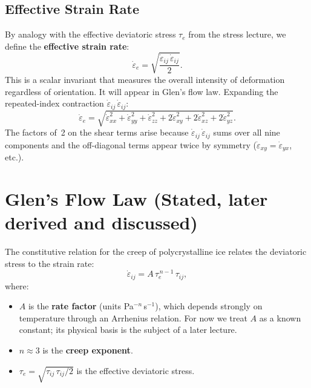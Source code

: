 \documentclass[11pt]{article}
\begin{document}
\subsection{Effective Strain Rate}

By analogy with the effective deviatoric stress $\tau_e$ from the stress lecture, we define the \textbf{effective strain rate}:
\begin{equation}
  \dot{\varepsilon}_e = \sqrt{\frac{\dot{\varepsilon}_{ij}\,\dot{\varepsilon}_{ij}}{2}}.
  \label{eq:eps_e}
\end{equation}
This is a scalar invariant that measures the overall intensity of deformation regardless of orientation.  It will appear in Glen's flow law.  Expanding the repeated-index contraction $\dot{\varepsilon}_{ij}\,\dot{\varepsilon}_{ij}$:
\begin{equation}
  \dot{\varepsilon}_e = \sqrt{\dot{\varepsilon}_{xx}^2 + \dot{\varepsilon}_{yy}^2 + \dot{\varepsilon}_{zz}^2 + 2\dot{\varepsilon}_{xy}^2 + 2\dot{\varepsilon}_{xz}^2 + 2\dot{\varepsilon}_{yz}^2}.
  \label{eq:eps_e_expanded}
\end{equation}
The factors of~2 on the shear terms arise because $\dot{\varepsilon}_{ij}\,\dot{\varepsilon}_{ij}$ sums over all nine components and the off-diagonal terms appear twice by symmetry ($\dot{\varepsilon}_{xy} = \dot{\varepsilon}_{yx}$, etc.).

\section{Glen's Flow Law (Stated, later derived and discussed)}
\label{sec:glen}

The constitutive relation for the creep of polycrystalline ice relates the deviatoric stress to the strain rate:
\begin{equation}
  \boxed{\dot{\varepsilon}_{ij} = A\,\tau_e^{\,n-1}\,\tau_{ij},}
  \label{eq:glen}
\end{equation}
where:
\begin{itemize}
  \item $A$ is the \textbf{rate factor} (units Pa$^{-n}$\,s$^{-1}$), which depends strongly on temperature through an Arrhenius relation.  For now we treat $A$ as a known constant; its physical basis is the subject of a later lecture.
  \item $n \approx 3$ is the \textbf{creep exponent}.
  \item $\tau_e = \sqrt{\tau_{ij}\,\tau_{ij}/2}$ is the effective deviatoric stress.
\end{itemize}
\end{document}
